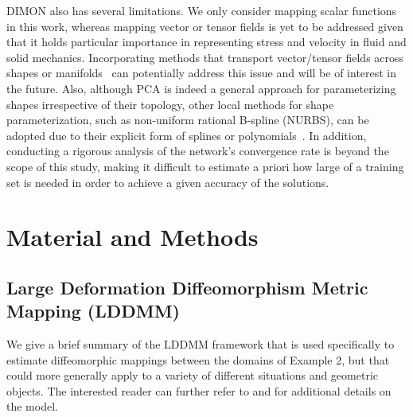 \documentclass[review]{elsarticle}
\begin{document}
DIMON also has several limitations. We only consider mapping scalar functions in this work, whereas mapping vector or tensor fields is yet to be addressed given that it holds particular importance in representing stress and velocity in fluid and solid mechanics. Incorporating methods that transport vector/tensor fields across shapes or manifolds~\cite{beg2005computing,donati2022complex,azencot2013operator} can potentially address this issue and will be of interest in the future. Also, although PCA is indeed a general approach for parameterizing shapes irrespective of their topology, other local methods for shape parameterization, such as non-uniform rational B-spline (NURBS), can be adopted due to their explicit form of splines or polynomials~\cite{bucelli2021multipatch,willems2023isogeometric}. 
In addition, conducting a rigorous analysis of the network's convergence rate is beyond the scope of this study, making it difficult to estimate a priori how large of a training set is needed in order to achieve a given accuracy of the solutions.


\section{Material and Methods}

\subsection{Large Deformation Diffeomorphism Metric Mapping (LDDMM)}\label{subsec:lddmm}
We give a brief summary of the LDDMM framework that is used specifically to estimate diffeomorphic mappings between the domains of Example 2, but that could more generally apply to a variety of different situations and geometric objects. The interested reader can further refer to \cite{beg2005computing} and \cite{younes2019shapes} for additional details on the model. 
\end{document}
